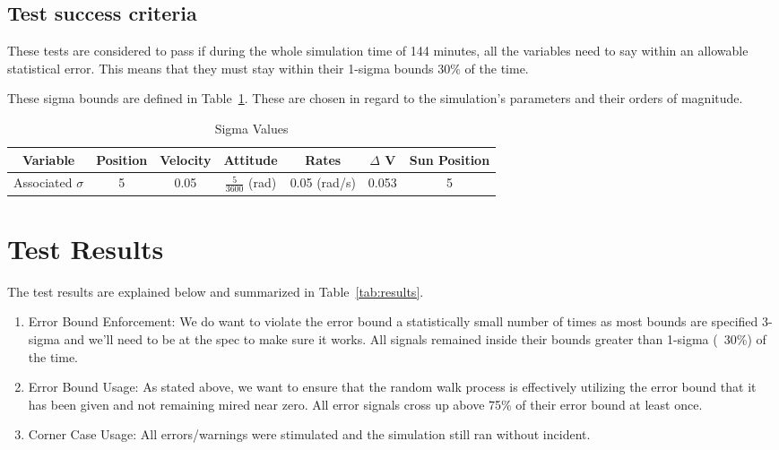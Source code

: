 \documentclass[]{BasiliskReportMemo}
\begin{document}
\subsection{Test success criteria}

These tests are considered to pass if during the whole simulation time of 144 minutes,
all the variables need to say within an allowable statistical error. This means that they
must stay within their 1-sigma bounds $30\%$ of the time.

These sigma bounds are defined in Table~\ref{tab:sigmas}. These are chosen in regard to
the simulation's parameters and their orders of magnitude.

\begin{table}[htbp]
    \caption{Sigma Values}
\label{tab:sigmas}
    \centering \fontsize{10}{10}\selectfont
\begin{tabular}{|c||c|c|c|c|c|c|}
\hline
Variable & Position & Velocity & Attitude & Rates & $\Delta$ V & Sun Position \\ \hline \hline
Associated $\sigma$ & 5 & 0.05 & $\frac{5}{3600}$ (rad) & 0.05 (rad/s) & 0.053 & 5 \\ \hline 
\end{tabular}
\end{table}



\section{Test Results}

The test results are explained below and summarized in Table~\ref{tab:results}.

\begin{enumerate}
\item{Error Bound Enforcement: We do want to violate the error bound a 
   statistically small number of times as most bounds are specified 3-sigma 
   and we'll need to be at the spec to make sure it works.  All signals remained 
   inside their bounds greater than 1-sigma (~30\%) of the time.  }
\item{Error Bound Usage: As stated above, we want to ensure that the random 
   walk process is effectively utilizing the error bound that it has been 
   given and not remaining mired near zero.  All error signals cross up above 
   75\% of their error bound at least once.}
\item{Corner Case Usage: All errors/warnings were stimulated and the simulation 
   still ran without incident. }
\end{enumerate}
\end{document}
